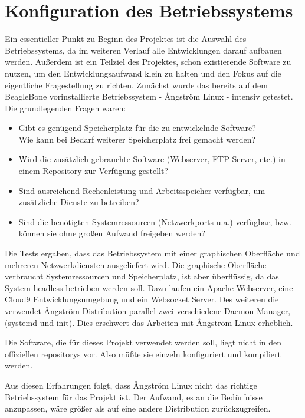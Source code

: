 \documentclass[thesis.tex]{subfiles}
\begin{document}
\chapter{Konfiguration des Betriebssystems}

Ein essentieller Punkt zu Beginn des Projektes ist die Auswahl des Betriebssystems, da im weiteren Verlauf alle Entwicklungen darauf aufbauen werden. Außerdem ist ein Teilziel des Projektes, schon existierende Software zu nutzen, um den Entwicklungsaufwand klein zu halten und den Fokus auf die eigentliche Fragestellung zu richten. Zunächst wurde das bereits auf dem BeagleBone vorinstallierte Betriebssystem - {\AA}ngström Linux - intensiv getestet.\\

\noindent Die grundlegenden Fragen waren:

\begin{itemize}
\item Gibt es genügend Speicherplatz für die zu entwickelnde Software?\\
Wie kann bei Bedarf weiterer Speicherplatz frei gemacht werden?
\item Wird die zusätzlich gebrauchte Software (Webserver, FTP Server, etc.) in einem Repository zur Verfügung gestellt?
\item Sind ausreichend Rechenleistung und Arbeitsspeicher verfügbar, um zusätzliche Dienste zu betreiben?
\item Sind die benötigten Systemressourcen (Netzwerkports u.a.) verfügbar, bzw. können sie ohne großen Aufwand freigeben werden?
\end{itemize}

Die Tests ergaben, dass das Betriebssystem mit einer graphischen Oberfläche und mehreren Netzwerkdiensten ausgeliefert wird. Die graphische Oberfläche verbraucht Systemressourcen und Speicherplatz, ist aber überflüssig, da das System headless betrieben werden soll. Dazu laufen ein Apache Webserver, eine Cloud9 Entwicklungsumgebung und ein Websocket Server. Des weiteren die verwendet {\AA}ngström Distribution parallel zwei verschiedene Daemon Manager, (\gls{systemd} und \gls{init}). Dies erschwert das Arbeiten mit {\AA}ngström Linux erheblich.

Die Software, die für dieses Projekt verwendet werden soll, liegt nicht in den offiziellen \glspl{repository} vor. Also müßte sie einzeln konfiguriert und kompiliert werden.

Aus diesen Erfahrungen folgt, dass {\AA}ngström Linux nicht das richtige Betriebssystem für das Projekt ist. Der Aufwand, es an die Bedürfnisse anzupassen, wäre größer als auf eine andere Distribution zurückzugreifen.\\
\end{document}
